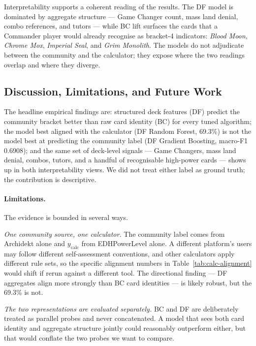 \documentclass{article}
\begin{document}
Interpretability supports a coherent reading of the results. The DF model is dominated by aggregate structure --- Game Changer count, mass land denial, combo references, and tutors --- while BC lift surfaces the cards that a Commander player would already recognise as bracket-4 indicators: \textit{Blood Moon}, \textit{Chrome Mox}, \textit{Imperial Seal}, and \textit{Grim Monolith}. The models do not adjudicate between the community and the calculator; they expose where the two readings overlap and where they diverge.

\subsection{Discussion, Limitations, and Future Work}
\label{sec:conclusion:discussion}

The headline empirical findings are: structured deck features (DF) predict the community bracket better than raw card identity (BC) for every tuned algorithm; the model best aligned with the calculator (DF Random Forest, 69.3\%) is not the model best at predicting the community label (DF Gradient Boosting, macro-F1 0.6908); and the same set of deck-level signals --- Game Changers, mass land denial, combos, tutors, and a handful of recognisable high-power cards --- shows up in both interpretability views. We did not treat either label as ground truth; the contribution is descriptive.

\paragraph{Limitations.} The evidence is bounded in several ways.

\textit{One community source, one calculator.} The community label comes from Archidekt alone and \(y_{\text{calc}}\) from EDHPowerLevel alone. A different platform's users may follow different self-assessment conventions, and other calculators apply different rule sets, so the specific alignment numbers in Table~\ref{tab:calc-alignment} would shift if rerun against a different tool. The directional finding --- DF aggregates align more strongly than BC card identities --- is likely robust, but the 69.3\% is not.

\textit{The two representations are evaluated separately.} BC and DF are deliberately treated as parallel probes and never concatenated. A model that sees both card identity and aggregate structure jointly could reasonably outperform either, but that would conflate the two probes we want to compare.
\end{document}
